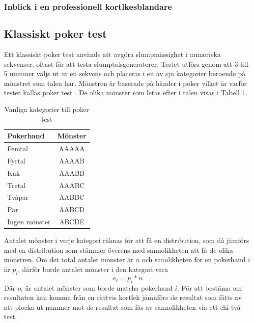 \documentclass[swedish,a4paper]{article}
\begin{document}
\subsubsection{Inblick i en professionell kortlkesblandare}
\label{sec:wheel}


\subsection{Klassiskt poker test}
\label{sec:poker_test}



Ett klassiskt poker test används att avgöra slump\-mässighet i numeriska 
sekvenser, oftast för att testa slumptalsgeneratorer. Testet utförs genom
att 3 till 5 nummer väljs ut ur en sekvens och placeras i en av sju
kategorier beroende på mönstret som talen har.  Mönstren är baserade på händer i poker vilket är varför testet kallas poker test \parencite{Abdel2014}. 
De olika mönster som letas efter i talen visas i Tabell \ref{tab:num_poker_hands}.
\begin{table}[H] 
	\centering
        \caption{Vanliga kategorier till poker test}
        \label{tab:num_poker_hands}
	\begin{tabular}{|l|c|}
	\hline 
	Pokerhand & Mönster \\ \hline  
	Femtal & AAAAA \\ \hline
	Fyrtal & AAAAB \\ \hline
	Kåk & AAABB \\ \hline
	Tretal & AAABC \\ \hline
	Tvåpar & AABBC \\ \hline
	Par & AABCD \\ \hline
    	Ingen mönster & ABCDE \\ \hline
	
\end{tabular}

\end{table}
\noindent
 Antalet mönster i varje kategori räknas för att få en distribution, som
 då jämförs med en distribution som stämmer överens med sannolikheten
 att få de olika mönstren. Om det total antalet mönster är $n$ och
 sanolikheten för en pokerhand $i$ är $p_i$, därför borde antalet mönster i
 den kategori vara $$e_i = p_i * n$$ Där $o_i$ är antalet mönster som
 borde matcha pokerhand $i$. För att bestäma om resultaten kan komma
 från en rättvis kortlek jämnförs de resultat som fåtts av att plocka
 ut nummer mot de resultat som fås av sannolikheten via ett chi-två-test.
\end{document}
